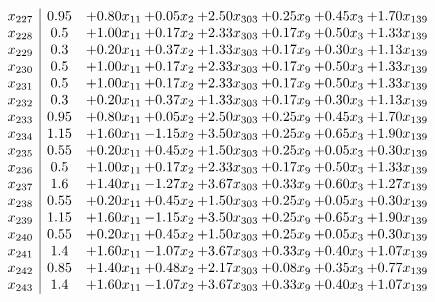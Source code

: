 \documentclass[8pt]{article}
\begin{document}
\[\begin{array}{c| c c@{\hskip 2pt} c@{\hskip 2pt} c@{\hskip 2pt} c@{\hskip 2pt} c@{\hskip 2pt} c@{\hskip 2pt} }
 x_{227}   &  0.95 & +  0.80 x_{11} & +  0.05 x_{2} & +  2.50 x_{303} & +  0.25 x_{9} & +  0.45 x_{3} & +  1.70 x_{139}\\
 x_{228}   &  0.5 & +  1.00 x_{11} & +  0.17 x_{2} & +  2.33 x_{303} & +  0.17 x_{9} & +  0.50 x_{3} & +  1.33 x_{139}\\
 x_{229}   &  0.3 & +  0.20 x_{11} & +  0.37 x_{2} & +  1.33 x_{303} & +  0.17 x_{9} & +  0.30 x_{3} & +  1.13 x_{139}\\
 x_{230}   &  0.5 & +  1.00 x_{11} & +  0.17 x_{2} & +  2.33 x_{303} & +  0.17 x_{9} & +  0.50 x_{3} & +  1.33 x_{139}\\
 x_{231}   &  0.5 & +  1.00 x_{11} & +  0.17 x_{2} & +  2.33 x_{303} & +  0.17 x_{9} & +  0.50 x_{3} & +  1.33 x_{139}\\
 x_{232}   &  0.3 & +  0.20 x_{11} & +  0.37 x_{2} & +  1.33 x_{303} & +  0.17 x_{9} & +  0.30 x_{3} & +  1.13 x_{139}\\
 x_{233}   &  0.95 & +  0.80 x_{11} & +  0.05 x_{2} & +  2.50 x_{303} & +  0.25 x_{9} & +  0.45 x_{3} & +  1.70 x_{139}\\
 x_{234}   &  1.15 & +  1.60 x_{11} & -1.15 x_{2} & +  3.50 x_{303} & +  0.25 x_{9} & +  0.65 x_{3} & +  1.90 x_{139}\\
 x_{235}   &  0.55 & +  0.20 x_{11} & +  0.45 x_{2} & +  1.50 x_{303} & +  0.25 x_{9} & +  0.05 x_{3} & +  0.30 x_{139}\\
 x_{236}   &  0.5 & +  1.00 x_{11} & +  0.17 x_{2} & +  2.33 x_{303} & +  0.17 x_{9} & +  0.50 x_{3} & +  1.33 x_{139}\\
 x_{237}   &  1.6 & +  1.40 x_{11} & -1.27 x_{2} & +  3.67 x_{303} & +  0.33 x_{9} & +  0.60 x_{3} & +  1.27 x_{139}\\
 x_{238}   &  0.55 & +  0.20 x_{11} & +  0.45 x_{2} & +  1.50 x_{303} & +  0.25 x_{9} & +  0.05 x_{3} & +  0.30 x_{139}\\
 x_{239}   &  1.15 & +  1.60 x_{11} & -1.15 x_{2} & +  3.50 x_{303} & +  0.25 x_{9} & +  0.65 x_{3} & +  1.90 x_{139}\\
 x_{240}   &  0.55 & +  0.20 x_{11} & +  0.45 x_{2} & +  1.50 x_{303} & +  0.25 x_{9} & +  0.05 x_{3} & +  0.30 x_{139}\\
 x_{241}   &  1.4 & +  1.60 x_{11} & -1.07 x_{2} & +  3.67 x_{303} & +  0.33 x_{9} & +  0.40 x_{3} & +  1.07 x_{139}\\
 x_{242}   &  0.85 & +  1.40 x_{11} & +  0.48 x_{2} & +  2.17 x_{303} & +  0.08 x_{9} & +  0.35 x_{3} & +  0.77 x_{139}\\
 x_{243}   &  1.4 & +  1.60 x_{11} & -1.07 x_{2} & +  3.67 x_{303} & +  0.33 x_{9} & +  0.40 x_{3} & +  1.07 x_{139}\\

\end{array}\]
\end{document}
